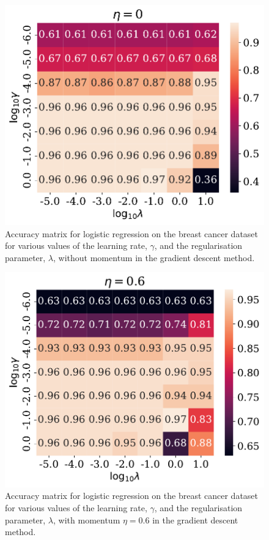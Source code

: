 \documentclass[a4paper,
amsfonts,
amssymb,
amsmath,
reprint,
showkeys,
nofootinbib,
twoside]{revtex4-2}
\begin{document}
\begin{figure}
    \centering
    \includegraphics[width = \columnwidth]{Figures/logreg_no_mom.pdf}
    \caption{Accuracy matrix for logistic regression on the breast cancer dataset for various values of the learning rate, $\gamma$, and the regularisation parameter, $\lambda$, without momentum in the gradient descent method.}
    \label{fig:logreg1}
\end{figure}

\begin{figure}
    \centering
    \includegraphics[width = \columnwidth]{Figures/logreg_mom.pdf}
    \caption{Accuracy matrix for logistic regression on the breast cancer dataset for various values of the learning rate, $\gamma$, and the regularisation parameter, $\lambda$, with momentum $\eta = 0.6$ in the gradient descent method.}
    \label{fig:logreg2}
\end{figure}
\end{document}
